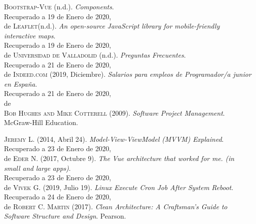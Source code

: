 \documentclass[openright,twoside,10pt]{book}
\begin{document}
\begin{thebibliography}{X}
\textsc{Bootstrap-Vue} (n.d.). \textit{Components}.
\\Recuperado a 19 de Enero de 2020, \\de \href{https://bootstrap-vue.org/docs/components}

\textsc{Leaflet}(n.d.). \textit{An open-source JavaScript library for mobile-friendly interactive maps}.
\\Recuperado a 19 de Enero de 2020, \\de \href{https://leafletjs.com/reference-1.6.0.html}

\textsc{Universidad de Valladolid} (n.d.). \textit{Preguntas Frecuentes}.
\\Recuperado a 21 de Enero de 2020, \\de \href{http://www.uva.es/export/sites/uva/2.docencia/2.02.mastersoficiales/2.02.13.preguntasfrecuentes/index.html}

\textsc{Indeed.com} (2019, Diciembre). \textit{Salarios para empleos de Programador/a junior en España}.
\\Recuperado a 21 de Enero de 2020, \\de \href{https://es.indeed.com/salaries/programador-junior-Salaries}

  \\
\textsc{Bob Hughes and Mike Cotterell} (2009). \textit{Software Project Management}. McGraw-Hill Education.

\textsc{Jeremy L.} (2014, Abril 24). \textit{Model-View-ViewModel (MVVM) Explained}.
\\Recuperado a 23 de Enero de 2020, \\de \href{https://www.wintellect.com/model-view-viewmodel-mvvm-explained/}

\textsc{Eder N.} (2017, Octubre 9). \textit{The Vue architecture that worked for me. (in small and large apps)}.
\\Recuperado a 23 de Enero de 2020, \\de \href{https://medium.com/@ederng/the-vue-architecture-that-worked-for-me-in-small-and-large-apps-9b253cf92951}

\textsc{Vivek G.} (2019, Julio 19). \textit{Linux Execute Cron Job After System Reboot}.
\\Recuperado a 24 de Enero de 2020, \\de \href{https://www.cyberciti.biz/faq/linux-execute-cron-job-after-system-reboot/}

\textsc{Robert C. Martin} (2017). \textit{Clean Architecture: A Craftsman's Guide to Software Structure and Design}. Pearson.

\end{thebibliography}
\end{document}
